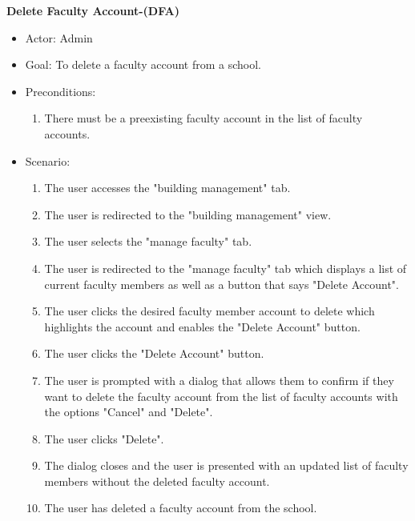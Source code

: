 \documentclass[letterpaper,12pt,oneside,listof=totoc]{scrreprt}
\begin{document}
\hfill \break
\textbf{Delete Faculty Account-(DFA)}
\begin{itemize}
    \item Actor: Admin
    \item Goal: To delete a faculty account from a school.
    \item Preconditions:
    \begin{enumerate}
        \item There must be a preexisting faculty account in the list of faculty accounts.
    \end{enumerate}
    \item Scenario:
    \begin{enumerate}
        \item The user accesses the "building management" tab. 
        \item The user is redirected to the "building management" view.
        \item The user selects the "manage faculty" tab.
        \item The user is redirected to the "manage faculty" tab which displays a list of current faculty members as well as a button that says "Delete Account".
        \item The user clicks the desired faculty member account to delete which highlights the account and enables the "Delete Account" button.
        \item The user clicks the "Delete Account" button.
        \item The user is prompted with a dialog that allows them to confirm if they want to delete the faculty account from the list of faculty accounts with the options "Cancel" and "Delete".
        \item The user clicks "Delete".
        \item The dialog closes and the user is presented with an updated list of faculty members without the deleted faculty account.
        \item The user has deleted a faculty account from the school.
    \end{enumerate}
\end{itemize}
\end{document}
